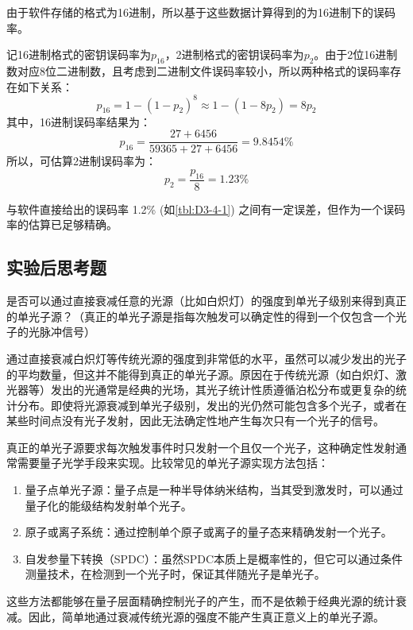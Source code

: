 \documentclass[dvipsnames, svgnames,a4paper,11pt]{article}
\begin{document}
		由于软件存储的格式为16进制，所以基于这些数据计算得到的为16进制下的误码率。

		记16进制格式的密钥误码率为$p_{16}$，2进制格式的密钥误码率为$p_{2}$。由于2位16进制数对应8位二进制数，且考虑到二进制文件误码率较小，所以两种格式的误码率存在如下关系：
		\[
			p_{16} = 1 - (1 - p_{2})^8 \approx 1 - (1 - 8p_{2}) = 8p_{2}
		\]
		其中，16进制误码率结果为：
		\[
			p_{16} = \frac{27 + 6456}{59365 + 27 + 6456} = 9.8454 \%
		\]
		所以，可估算2进制误码率为：
		\[
			p_{2} = \frac{p_{16}}{8} = 1.23 \%
		\]

		与软件直接给出的误码率 1.2\% (如\cref{tbl:D3-4-1}) 之间有一定误差，但作为一个误码率的估算已足够精确。

	
\subsection{实验后思考题}

\begin{question}
	是否可以通过直接衰减任意的光源（比如白炽灯）的强度到单光子级别来得到真正的单光子源？（真正的单光子源是指每次触发可以确定性的得到一个仅包含一个光子的光脉冲信号）
\end{question}

	通过直接衰减白炽灯等传统光源的强度到非常低的水平，虽然可以减少发出的光子的平均数量，但这并不能得到真正的单光子源。原因在于传统光源（如白炽灯、激光器等）发出的光通常是经典的光场，其光子统计性质遵循泊松分布或更复杂的统计分布。即使将光源衰减到单光子级别，发出的光仍然可能包含多个光子，或者在某些时间点没有光子发射，因此无法确定性地产生每次只有一个光子的信号。

	真正的单光子源要求每次触发事件时只发射一个且仅一个光子，这种确定性发射通常需要量子光学手段来实现。比较常见的单光子源实现方法包括：
	\begin{enumerate}
		\item 量子点单光子源：量子点是一种半导体纳米结构，当其受到激发时，可以通过量子化的能级结构发射单个光子。
		\item 原子或离子系统：通过控制单个原子或离子的量子态来精确发射一个光子。
		\item 自发参量下转换（SPDC）：虽然SPDC本质上是概率性的，但它可以通过条件测量技术，在检测到一个光子时，保证其伴随光子是单光子。
	\end{enumerate}

	这些方法都能够在量子层面精确控制光子的产生，而不是依赖于经典光源的统计衰减。因此，简单地通过衰减传统光源的强度不能产生真正意义上的单光子源。
\end{document}
